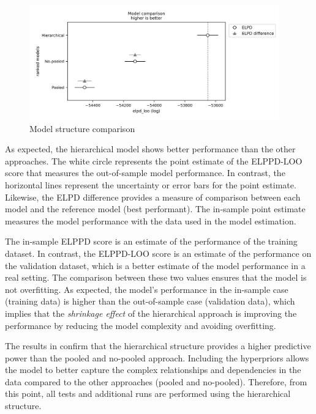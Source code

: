 \begin{figure}[H]
    \centering
    \includegraphics[width=0.96\textwidth]{images/ch5_model_structure_comparison/model_structure_comparison.png}
    \setlength{\abovecaptionskip}{-12pt}
    \caption{Model structure comparison }
    \label{fig:model_comparison}
\end{figure}

As expected, the hierarchical model shows better performance than the other approaches. The white circle represents the point estimate of the ELPPD-LOO score that measures the out-of-sample model performance. In contrast, the horizontal lines represent the uncertainty or error bars for the point estimate. Likewise, the ELPD difference provides a measure of comparison between each model and the reference model (best performant). The in-sample point estimate measures the model performance with the data used in the model estimation.  

The in-sample ELPPD score is an estimate of the performance of the training dataset. In contrast, the ELPPD-LOO score is an estimate of the performance on the validation dataset, which is a better estimate of the model performance in a real setting. The comparison between these two values ensures that the model is not overfitting. As expected, the model's performance in the in-sample case (training data) is higher than the out-of-sample case (validation data), which implies that the \textit{shrinkage effect} of the hierarchical approach is improving the performance by reducing the model complexity and avoiding overfitting. 

The results in  confirm that the hierarchical structure provides a higher predictive power than the pooled and no-pooled approach. Including the hyperpriors allows the model to better capture the complex relationships and dependencies in the data compared to the other approaches (pooled and no-pooled). Therefore, from this point, all tests and additional runs are performed using the hierarchical structure.

